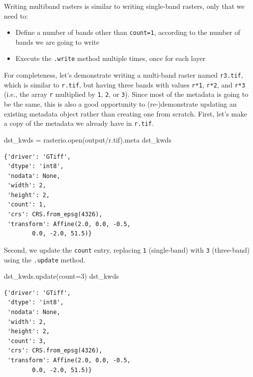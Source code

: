 \documentclass[
  letterpaper,
]{krantz}
\newenvironment{Shaded}{\begin{snugshade}}{\end{snugshade}}
\newcommand{\BuiltInTok}[1]{\textcolor[rgb]{0.00,0.23,0.31}{#1}}
\newcommand{\DecValTok}[1]{\textcolor[rgb]{0.68,0.00,0.00}{#1}}
\newcommand{\NormalTok}[1]{\textcolor[rgb]{0.00,0.23,0.31}{#1}}
\newcommand{\OperatorTok}[1]{\textcolor[rgb]{0.37,0.37,0.37}{#1}}
\newcommand{\StringTok}[1]{\textcolor[rgb]{0.13,0.47,0.30}{#1}}
\providecommand{\tightlist}{%
  \setlength{\itemsep}{0pt}\setlength{\parskip}{0pt}}\usepackage{longtable,booktabs,array}
\begin{document}
Writing multiband rasters is similar to writing single-band rasters,
only that we need to:

\begin{itemize}
\tightlist
\item
  Define a number of bands other than \texttt{count=1}, according to the
  number of bands we are going to write
\item
  Execute the \texttt{.write} method multiple times, once for each layer
\end{itemize}

For completeness, let's demonstrate writing a multi-band raster named
\texttt{r3.tif}, which is similar to \texttt{r.tif}, but having three
bands with values \texttt{r*1}, \texttt{r*2}, and \texttt{r*3} (i.e.,
the array \texttt{r} multiplied by \texttt{1}, \texttt{2}, or
\texttt{3}). Since most of the metadata is going to be the same, this is
also a good opportunity to (re-)demonstrate updating an existing
metadata object rather than creating one from scratch. First, let's make
a copy of the metadata we already have in \texttt{r.tif}.

\begin{Shaded}
\begin{Highlighting}[]
\NormalTok{dst\_kwds }\OperatorTok{=}\NormalTok{ rasterio.}\BuiltInTok{open}\NormalTok{(}\StringTok{\textquotesingle{}output/r.tif\textquotesingle{}}\NormalTok{).meta}
\NormalTok{dst\_kwds}
\end{Highlighting}
\end{Shaded}

\begin{verbatim}
{'driver': 'GTiff',
 'dtype': 'int8',
 'nodata': None,
 'width': 2,
 'height': 2,
 'count': 1,
 'crs': CRS.from_epsg(4326),
 'transform': Affine(2.0, 0.0, -0.5,
        0.0, -2.0, 51.5)}
\end{verbatim}

Second, we update the \texttt{count} entry, replacing \texttt{1}
(single-band) with \texttt{3} (three-band) using the \texttt{.update}
method.

\begin{Shaded}
\begin{Highlighting}[]
\NormalTok{dst\_kwds.update(count}\OperatorTok{=}\DecValTok{3}\NormalTok{)}
\NormalTok{dst\_kwds}
\end{Highlighting}
\end{Shaded}

\begin{verbatim}
{'driver': 'GTiff',
 'dtype': 'int8',
 'nodata': None,
 'width': 2,
 'height': 2,
 'count': 3,
 'crs': CRS.from_epsg(4326),
 'transform': Affine(2.0, 0.0, -0.5,
        0.0, -2.0, 51.5)}
\end{verbatim}
\end{document}
